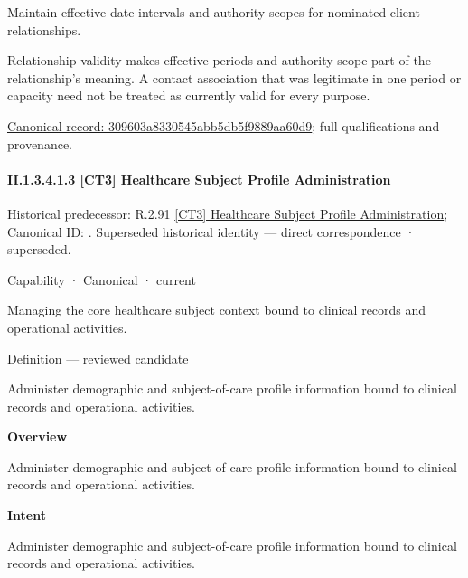 Maintain effective date intervals and authority scopes for nominated client relationships.



Relationship validity makes effective periods and authority scope part of the relationship's meaning. A contact association that was legitimate in one period or capacity need not be treated as currently valid for every purpose.


{\footnotesize \href{../../../../continuum/strategy/capability/feature/309603a8330545abb5db5f9889aa60d9.md}{Canonical record: 309603a8330545abb5db5f9889aa60d9}; full qualifications and provenance.}\par
\paragraph*{II.1.3.4.1.3 [CT3] Healthcare Subject Profile Administration}
\label{navigation:II.1.3.4.1.3}

{\small Historical predecessor: R.2.91 \hyperref[element:d653c3247ddd49479f985f6b435933a0]{[CT3] Healthcare Subject Profile Administration}; Canonical ID: \texttt{}. Superseded historical identity — direct correspondence · superseded.}\par
\label{element:df214b5499694b768eb4a7a175a9d471}
{\small Capability · Canonical · current}\par

Managing the core healthcare subject context bound to clinical records and operational activities.



Definition — reviewed candidate



Administer demographic and subject-of-care profile information bound to clinical records and operational activities.



\textbf{Overview}



Administer demographic and subject-of-care profile information bound to clinical records and operational activities.



\textbf{Intent}



Administer demographic and subject-of-care profile information bound to clinical records and operational activities.



